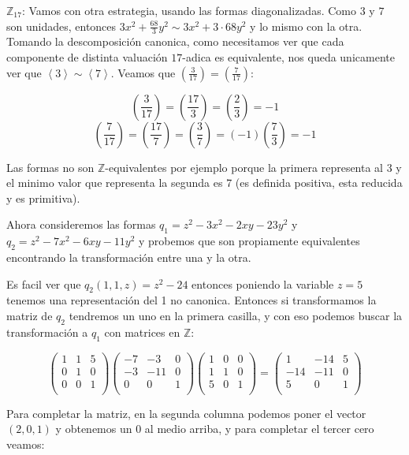 \documentclass[12pt]{amsart}
\newcommand{\ZZ}{\mathbb{Z}}
\newcommand{\leg}[2]{\left( \frac{#1}{#2} \right)}
\newcommand{\lp}{\left(}
\newcommand{\rp}{\right)}
\newcommand{\lc}{\left<}
\newcommand{\rc}{\right>}
\theoremstyle{plain}
\begin{document}
$\ZZ_{17}$: Vamos con otra estrategia, usando las formas 
diagonalizadas. Como $3$ y $7$ son unidades, entonces 
$3x^2+\frac{68}{3}y^2\sim 3x^2+3\cdot68y^2$ y lo mismo con
la otra. Tomando la descomposición canonica, como
necesitamos ver que cada componente de distinta valuación 
$17$-adica es equivalente, nos queda unicamente ver que 
$\lc3\rc \sim\lc7\rc$. Veamos que $\leg{3}{17}=\leg{7}{17}$:

$$\leg{3}{17} = \leg{17}{3} = \leg{2}{3} =-1$$
$$\leg{7}{17} = \leg{17}{7} = \leg{3}{7} = (-1)\leg{7}{3} 
= -1$$

Las formas no son $\ZZ$-equivalentes por ejemplo porque la 
primera representa al 3 y el minimo valor que representa la 
segunda es 7 (es definida positiva, esta reducida y es 
primitiva).

Ahora consideremos las formas $q_1=z^2-3x^2-2xy-23y^2$ y 
$q_2=z^2-7x^2-6xy-11y^2$ y probemos que son propiamente 
equivalentes encontrando la transformación entre una y la 
otra.

Es facil ver que $q_2(1,1,z)=z^2-24$ entonces poniendo la 
variable $z=5$ tenemos una representación del 1 no canonica.
Entonces si transformamos la matriz de $q_2$ tendremos un 
uno en la primera casilla, y con eso podemos buscar la 
transformación a $q_1$ con matrices en $\ZZ$:

$$\lp\begin{matrix}
    1&1&5 \\
    0&1&0 \\
    0&0&1 \\
\end{matrix}\rp
\lp\begin{matrix}
    -7&-3&0 \\
    -3&-11&0 \\
    0&0&1 \\
\end{matrix}\rp
\lp\begin{matrix}
    1&0&0 \\
    1&1&0 \\
    5&0&1 \\
\end{matrix}\rp = 
\lp\begin{matrix}
    1&-14&5 \\
    -14&-11&0 \\
    5&0&1 \\
\end{matrix}\rp$$

Para completar la matriz, en la segunda columna podemos 
poner el vector $(2,0,1)$ y obtenemos un 0 al medio arriba, 
y para completar el tercer cero veamos:
\end{document}
